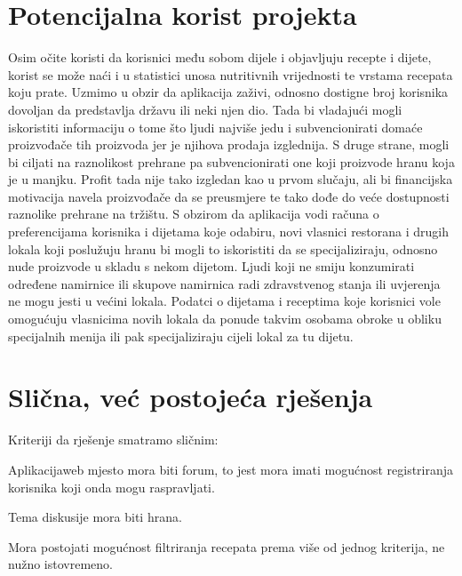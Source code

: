 	\section{Potencijalna korist projekta}
	Osim očite koristi da korisnici među sobom dijele i objavljuju recepte i dijete, korist se može naći i u statistici unosa nutritivnih vrijednosti te vrstama recepata koju prate. Uzmimo u obzir da aplikacija \glqq zaživi\grqq, odnosno dostigne broj korisnika dovoljan da predstavlja državu ili neki njen dio. Tada bi vladajući mogli iskoristiti informaciju o tome što ljudi najviše jedu i subvencionirati domaće proizvođače tih proizvoda jer je njihova prodaja izglednija. S druge strane, mogli bi ciljati na raznolikost prehrane pa subvencionirati one koji proizvode hranu koja je u manjku. Profit tada nije tako izgledan kao u prvom slučaju, ali bi financijska motivacija navela proizvođače da se preusmjere te tako dođe do veće dostupnosti raznolike prehrane na tržištu. S obzirom da aplikacija vodi računa o preferencijama korisnika i dijetama koje odabiru, novi vlasnici restorana i drugih lokala koji poslužuju hranu bi mogli to iskoristiti da se specijaliziraju, odnosno nude proizvode u skladu s nekom dijetom. Ljudi koji ne smiju konzumirati određene namirnice ili skupove namirnica radi zdravstvenog stanja ili uvjerenja ne mogu jesti u većini lokala. Podatci o dijetama i receptima koje korisnici vole omogućuju vlasnicima novih lokala da ponude takvim osobama obroke u obliku specijalnih menija ili pak specijaliziraju cijeli lokal za tu dijetu.

	\section{Slična, već postojeća rješenja}
	Kriteriji da rješenje smatramo sličnim:
	\begin{packed_item}
		\item Aplikacija\/web mjesto mora biti forum, to jest mora imati mogućnost registriranja korisnika koji onda mogu raspravljati.
		\item Tema diskusije mora biti hrana.
		\item Mora postojati mogućnost filtriranja recepata prema više od jednog kriterija, ne nužno istovremeno.
	\end{packed_item}

